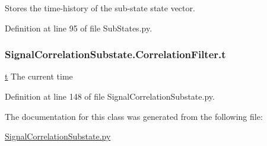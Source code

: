 Stores the time-\/history of the sub-\/state state vector. 



Definition at line 95 of file Sub\+States.\+py.

\subsubsection[{\texorpdfstring{t}{t}}]{\setlength{\rightskip}{0pt plus 5cm}Signal\+Correlation\+Substate.\+Correlation\+Filter.\+t}\hypertarget{classSignalCorrelationSubstate_1_1CorrelationFilter_a7931bebb63d9482b44f69d31786c4086}{}\label{classSignalCorrelationSubstate_1_1CorrelationFilter_a7931bebb63d9482b44f69d31786c4086}


\hyperlink{classSignalCorrelationSubstate_1_1CorrelationFilter_a7931bebb63d9482b44f69d31786c4086}{t} The current time 



Definition at line 148 of file Signal\+Correlation\+Substate.\+py.



The documentation for this class was generated from the following file\+:\begin{DoxyCompactItemize}
\item 
\hyperlink{SignalCorrelationSubstate_8py}{Signal\+Correlation\+Substate.\+py}\end{DoxyCompactItemize}
